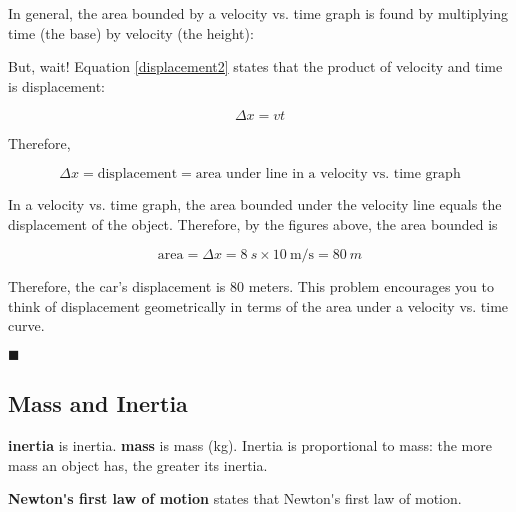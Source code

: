 \documentclass[dvipsnames]{article}
\begin{document}
In general, the area bounded by a velocity vs. time graph is found by multiplying time (the base) by velocity (the height):

\begin{center}
\end{center}

But, wait! Equation \eqref{displacement2} states that the product of velocity and time is displacement: 

\begin{equation*}
    \Delta x = v t
\end{equation*}

Therefore,

\begin{equation*}
    \Delta x = \text{displacement} = \text{area under line in a velocity vs. time graph}
\end{equation*}

In a velocity vs. time graph, the area bounded under the velocity line equals the displacement of the object. Therefore, by the figures above, the area bounded is

\begin{equation*}
    \text{area} = \Delta x = \SI{8}{s} \times \SI[per-mode=fraction]{10}{\meter\per\second} = \boxed{\SI{80}{m}}
\end{equation*}

Therefore, the car's displacement is 80 meters. This problem encourages you to think of displacement geometrically in terms of the area under a velocity vs. time curve.

\hfill $\blacksquare$


\subsection{Mass and Inertia}

\textbf{\Gls{inertia}} is \glsdesc{inertia}. \textbf{\Gls{mass}} is \glsdesc{mass} (kg). Inertia is proportional to mass: the more mass an object has, the greater its inertia. 

\textbf{\gls{Newton's first law of motion}} states that \glsdesc{Newton's first law of motion}.
\end{document}
